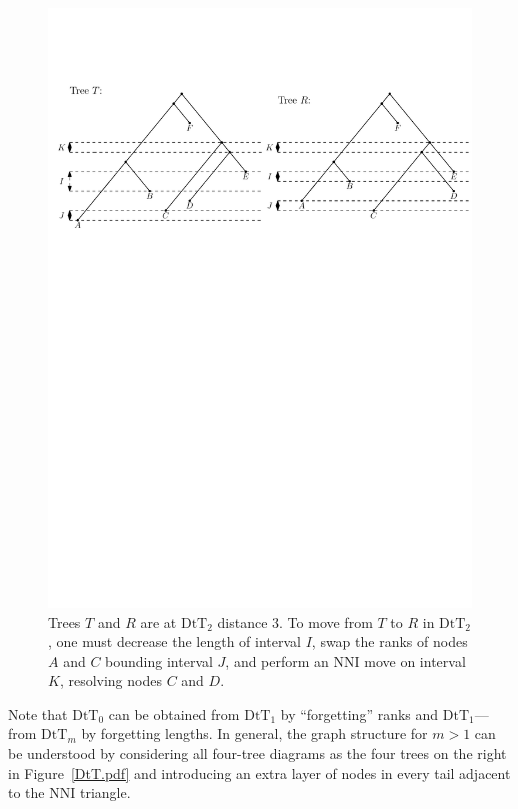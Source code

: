 \documentclass[11pt]{amsart}
\theoremstyle{definition}
\newcommand{\nni}{\mathrm{NNI}}
\newcommand{\dtt}{\mathrm{DtT}}
\begin{document}
\begin{figure}[ht]
\centering
\includegraphics[width=\textwidth]{dts_neighbors.pdf}
\caption{Trees $T$ and $R$ are at $\dtt_2$ distance $3$.
To move from $T$ to $R$ in $\dtt_2$, one must decrease the length of interval $I$, swap the ranks of nodes $A$ and $C$ bounding interval $J$, and perform an $\nni$ move on interval $K$, resolving nodes $C$ and $D$.}
\label{dts_neighbors.pdf}
\end{figure}

Note that $\dtt_0$ can be obtained from $\dtt_1$ by ``forgetting'' ranks and $\dtt_1$---from $\dtt_m$ by forgetting lengths.
In general, the graph structure for $m > 1$ can be understood by considering all four-tree diagrams as the four trees on the right in Figure~\ref{DtT.pdf} and introducing an extra layer of nodes in every tail adjacent to the $\nni$ triangle.
\end{document}
